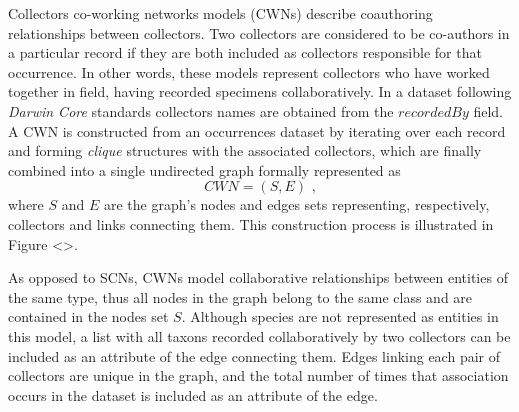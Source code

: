 

Collectors co-working networks models (CWNs) describe coauthoring relationships between collectors. Two collectors are considered to be co-authors in a particular record if they are both included as collectors responsible for that occurrence. In other words, these models represent collectors who have worked together in field, having recorded specimens collaboratively.
In a dataset following \textit{Darwin Core} standards collectors names are obtained from the $recordedBy$ field.
A CWN is constructed from an occurrences dataset by iterating over each record and forming \textit{clique} structures with the associated collectors, which are finally combined into a single undirected graph formally represented as 
$$CWN = (S,E) \mbox{ ,}$$
where $S$ and $E$ are the graph's nodes and edges sets representing, respectively, collectors and links connecting them. This construction process is illustrated in Figure <>. %

As opposed to SCNs, CWNs model collaborative relationships between entities of the same type, thus all nodes in the graph belong to the same class and are contained in the nodes set $S$. 
Although species are not represented as entities in this model, a list with all taxons recorded collaboratively by two collectors can be included as an attribute of the edge connecting them.
Edges linking each pair of collectors are unique in the graph, and the total number of times that association occurs in the dataset is included as an attribute of the edge.


